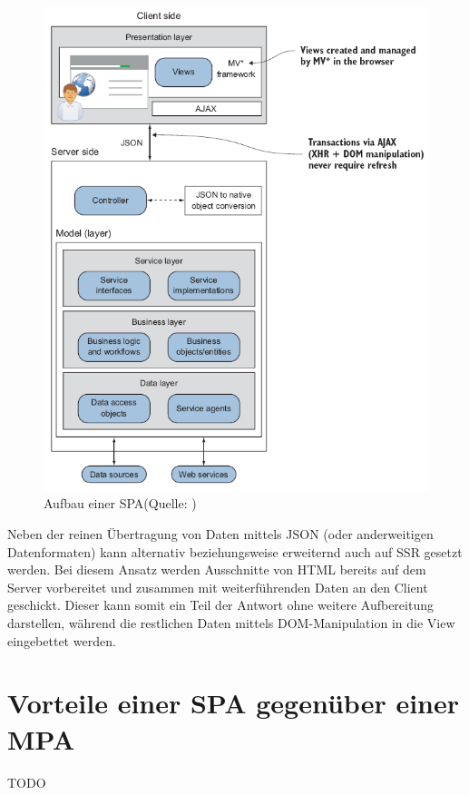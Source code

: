 \documentclass[a4paper,12pt,twoside]{scrreprt}
\begin{document}
\begin{figure}[ht]
    \centering
    \includegraphics[scale=0.60]{images/SPA_overview_Scott.png}
    \caption[Aufbau einer \acl{SPA}]{Aufbau einer \acl{SPA}\newline(Quelle: \cite[][Seite 6]{scott_spa_2015})}
    \label{fig:spa-overview}
\end{figure}

Neben der reinen Übertragung von Daten mittels \acs{JSON} (oder anderweitigen Datenformaten) kann alternativ beziehungsweise erweiternd auch auf \ac{SSR} gesetzt werden. Bei diesem Ansatz werden Ausschnitte von HTML bereits auf dem Server vorbereitet und zusammen mit weiterführenden Daten an den Client geschickt. Dieser kann somit ein Teil der Antwort ohne weitere Aufbereitung darstellen, während die restlichen Daten mittels \acs{DOM}-Manipulation in die View eingebettet werden. \parencite[][Seite 7]{scott_spa_2015} 

\section{Vorteile einer \acs{SPA} gegenüber einer \acs{MPA}}
\label{sec:vorteile-spa-mpa}
TODO
\end{document}

